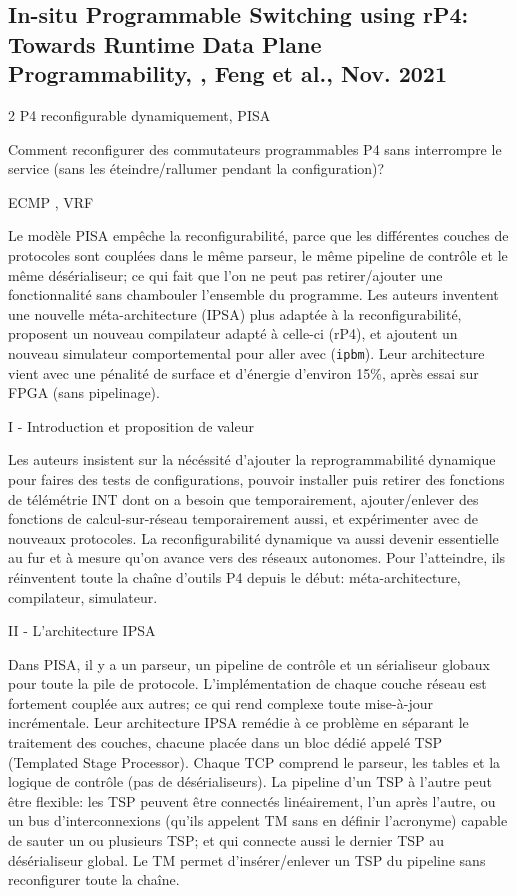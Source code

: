 
\subsection{In-situ Programmable Switching using rP4: Towards Runtime Data Plane Programmability, \cite{feng_situ_2021}, Feng et al., Nov. 2021}
 2
 P4 reconfigurable dynamiquement, PISA

 Comment reconfigurer des commutateurs programmables P4 sans interrompre le service (sans les éteindre/rallumer pendant la configuration)?

 ECMP \cite{noauthor_equal-cost_2023}, VRF \cite{noauthor_virtual_2021}

 Le modèle PISA empêche la reconfigurabilité, parce que les différentes couches de protocoles sont couplées dans le même parseur, le même pipeline de contrôle et le même désérialiseur; ce qui fait que l'on ne peut pas retirer/ajouter une fonctionnalité sans chambouler l'ensemble du programme. Les auteurs inventent une nouvelle méta-architecture (IPSA) plus adaptée à la reconfigurabilité, proposent un nouveau compilateur adapté à celle-ci (rP4), et ajoutent un nouveau simulateur comportemental pour aller avec (\texttt{ipbm}). Leur architecture vient avec une pénalité de surface et d'énergie d'environ 15\%, après essai sur FPGA (sans pipelinage).


I - Introduction et proposition de valeur

Les auteurs insistent sur la nécéssité d'ajouter la reprogrammabilité dynamique pour faires des tests de configurations, pouvoir installer puis retirer des fonctions de télémétrie INT dont on a besoin que temporairement, ajouter/enlever des fonctions de calcul-sur-réseau temporairement aussi, et expérimenter avec de nouveaux protocoles. La reconfigurabilité dynamique va aussi devenir essentielle au fur et à mesure qu'on avance vers des réseaux autonomes. Pour l'atteindre, ils réinventent toute la chaîne d'outils P4 depuis le début: méta-architecture, compilateur, simulateur.

II - L'architecture IPSA

Dans PISA, il y a un parseur, un pipeline de contrôle et un sérialiseur globaux pour toute la pile de protocole. L'implémentation de chaque couche réseau est fortement couplée aux autres; ce qui rend complexe toute mise-à-jour incrémentale. Leur architecture IPSA remédie à ce problème en séparant le traitement des couches, chacune placée dans un bloc dédié appelé TSP (Templated Stage Processor). Chaque TCP comprend le parseur, les tables et la logique de contrôle (pas de désérialiseurs). La pipeline d'un TSP à l'autre peut être flexible: les TSP peuvent être connectés linéairement, l'un après l'autre, ou un bus d'interconnexions (qu'ils appelent TM sans en définir l'acronyme) capable de sauter un ou plusieurs TSP; et qui connecte aussi le dernier TSP au désérialiseur global. Le TM permet d'insérer/enlever un TSP du pipeline sans reconfigurer toute la chaîne.

